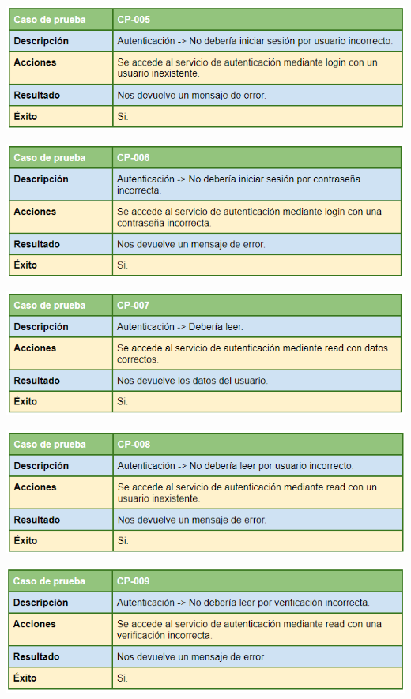 \bigskip

\includegraphics[width=\textwidth]{img/cap7/cp-005.png}

\bigskip

\includegraphics[width=\textwidth]{img/cap7/cp-006.png}

\bigskip

\includegraphics[width=\textwidth]{img/cap7/cp-007.png}

\bigskip

\includegraphics[width=\textwidth]{img/cap7/cp-008.png}

\bigskip

\includegraphics[width=\textwidth]{img/cap7/cp-009.png}

